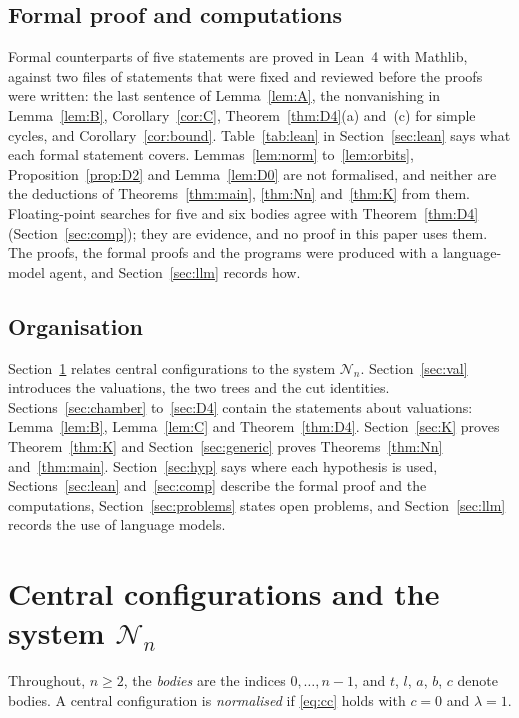 \documentclass[11pt]{amsart}
\theoremstyle{definition}
\theoremstyle{remark}
\numberwithin{equation}{section}
\newcommand{\cN}{\mathcal{N}}
\begin{document}
\subsection*{Formal proof and computations} Formal counterparts of five statements are proved in
Lean~4 with Mathlib, against two files of statements that were fixed and reviewed before the proofs
were written: the last sentence of Lemma~\ref{lem:A}, the nonvanishing in Lemma~\ref{lem:B},
Corollary~\ref{cor:C}, Theorem~\ref{thm:D4}(a) and~(c) for simple cycles, and
Corollary~\ref{cor:bound}. Table~\ref{tab:lean} in Section~\ref{sec:lean} says what each formal
statement covers. Lemmas~\ref{lem:norm} to~\ref{lem:orbits}, Proposition~\ref{prop:D2} and
Lemma~\ref{lem:D0} are not formalised, and neither are the deductions of Theorems~\ref{thm:main},
\ref{thm:Nn} and~\ref{thm:K} from them. Floating-point searches for five and six bodies agree
with Theorem~\ref{thm:D4} (Section~\ref{sec:comp}); they are evidence, and no proof in this paper uses
them. The proofs, the formal proofs and the programs were produced with a language-model agent, and
Section~\ref{sec:llm} records how.

\subsection*{Organisation} Section~\ref{sec:system} relates central configurations to the system
$\cN_n$. Section~\ref{sec:val} introduces the valuations, the two trees and the cut identities.
Sections~\ref{sec:chamber} to~\ref{sec:D4} contain the statements about valuations: Lemma~\ref{lem:B},
Lemma~\ref{lem:C} and Theorem~\ref{thm:D4}. Section~\ref{sec:K} proves Theorem~\ref{thm:K} and
Section~\ref{sec:generic} proves Theorems~\ref{thm:Nn} and~\ref{thm:main}. Section~\ref{sec:hyp} says
where each hypothesis is used, Sections~\ref{sec:lean} and~\ref{sec:comp} describe the formal proof and
the computations, Section~\ref{sec:problems} states open problems, and Section~\ref{sec:llm} records the
use of language models.

\section{Central configurations and the system \texorpdfstring{$\cN_n$}{N\_n}}\label{sec:system}

Throughout, $n \ge 2$, the \emph{bodies} are the indices $0, \dots, n-1$, and $t$, $l$, $a$, $b$, $c$
denote bodies. A central configuration is \emph{normalised} if \eqref{eq:cc} holds with $c = 0$ and
$\lambda = 1$.
\end{document}

